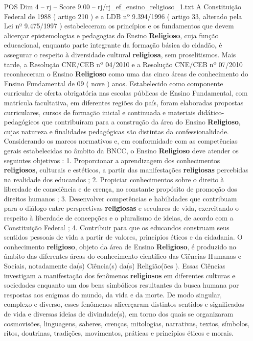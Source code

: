 \begin{textsample}{POS Dim 4 – rj – Score 9.00 – rj/rj\_ef\_ensino\_religioso\_1.txt}
A Constituição Federal de 1988 ( artigo 210 ) e a LDB nº 9.394/1996 ( artigo 33, alterado pela Lei nº 9.475/1997 ) estabeleceram os princípios e os fundamentos que devem alicerçar epistemologias e pedagogias do Ensino \textbf{Religioso}, cuja função educacional, enquanto parte integrante da formação básica do cidadão, é assegurar o respeito à diversidade cultural \textbf{religiosa}, sem proselitismos.
Mais tarde, a Resolução CNE/CEB nº 04/2010 e a Resolução CNE/CEB nº 07/2010 reconheceram o Ensino \textbf{Religioso} como uma das cinco áreas de conhecimento do Ensino Fundamental de 09 ( nove ) anos.
Estabelecido como componente curricular de oferta obrigatória nas escolas públicas de Ensino Fundamental, com matrícula facultativa, em diferentes regiões do país, foram elaboradas propostas curriculares, cursos de formação inicial e continuada e materiais didático-pedagógicos que contribuíram para a construção da área do Ensino \textbf{Religioso}, cujas natureza e finalidades pedagógicas são distintas da confessionalidade.
Considerando os marcos normativos e, em conformidade com as competências gerais estabelecidas no âmbito da BNCC, o Ensino \textbf{Religioso} deve atender os seguintes objetivos : 1.
Proporcionar a aprendizagem dos conhecimentos \textbf{religiosos}, culturais e estéticos, a partir das manifestações \textbf{religiosas} percebidas na realidade dos educandos ; 2.
Propiciar conhecimentos sobre o direito à liberdade de consciência e de crença, no constante propósito de promoção dos direitos humanos ; 3.
Desenvolver competências e habilidades que contribuam para o diálogo entre perspectivas \textbf{religiosas} e seculares de vida, exercitando o respeito à liberdade de concepções e o pluralismo de ideias, de acordo com a Constituição Federal ; 4.
Contribuir para que os educandos construam seus sentidos pessoais de vida a partir de valores, princípios éticos e da cidadania.
O conhecimento \textbf{religioso}, objeto da área de Ensino \textbf{Religioso}, é produzido no âmbito das diferentes áreas do conhecimento científico das Ciências Humanas e Sociais, notadamente da(s) Ciência(s) da(s) Religião(ões ).
Essas Ciências investigam a manifestação dos fenômenos \textbf{religiosos} em diferentes culturas e sociedades enquanto um dos bens simbólicos resultantes da busca humana por respostas aos enigmas do mundo, da vida e da morte.
De modo singular, complexo e diverso, esses fenômenos alicerçaram distintos sentidos e significados de vida e diversas ideias de divindade(s), em torno dos quais se organizaram cosmovisões, linguagens, saberes, crenças, mitologias, narrativas, textos, símbolos, ritos, doutrinas, tradições, movimentos, práticas e princípios éticos e morais.

\end{textsample}
